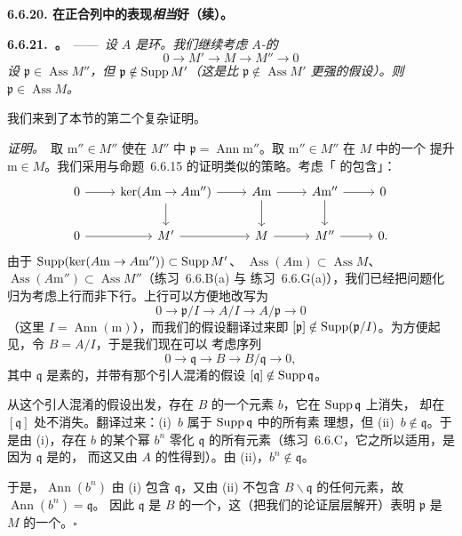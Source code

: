 \textbf{6.6.20. \trAssociatedPoint{}在正合列中的表现\emph{相当}好（续）。}

\textbf{6.6.21.\ \trhProposition。}\ ——\ \emph{设 $A$ 是\trNoetherian{}环。我们继续考虑
$A$-\trModule{}的\trShortExactSequence}
\[
0\longrightarrow M'\longrightarrow M\longrightarrow M''\longrightarrow 0
\]
\emph{设 $\mathfrak{p}\in\operatorname{Ass}M''$，但 $\mathfrak{p}\notin\operatorname{Supp} M'$（这是比
$\mathfrak{p}\notin\operatorname{Ass}M'$ 更强的假设）。则 $\mathfrak{p}\in\operatorname{Ass}M$。}

我们来到了本节的第二个复杂证明。

\emph{证明。}\ 取 $\mathrm{m}''\in M''$ 使在 $M''$ 中
$\mathfrak{p}=\operatorname{Ann}\mathrm{m}''$。取 $\mathrm{m}''\in M''$ 在 $M$ 中的一个
提升 $\mathrm{m}\in M$。我们采用与命题~6.6.15 的证明类似的策略。考虑「\trShortExactSequence{}%
的包含」：
\[
\begin{tikzcd}
0 \ar[r] & \ker(A\mathrm{m}\to A\mathrm{m}'') \ar[r] \ar[d] & A\mathrm{m} \ar[r] \ar[d] & A\mathrm{m}'' \ar[r] \ar[d] & 0 \\
0 \ar[r] & M' \ar[r] & M \ar[r] & M'' \ar[r] & 0.
\end{tikzcd}
\]
由于 $\operatorname{Supp}(\ker(A\mathrm{m}\to A\mathrm{m}''))\subset\operatorname{Supp} M'$、%
$\operatorname{Ass}(A\mathrm{m})\subset\operatorname{Ass}M$、%
$\operatorname{Ass}(A\mathrm{m}'')\subset\operatorname{Ass}M''$（练习~6.6.B(a) 与
练习~6.6.G(a)），我们已经把问题化归为考虑上行而非下行。上行可以方便地改写为
\[
0\longrightarrow\mathfrak{p}/I\longrightarrow A/I\longrightarrow A/\mathfrak{p}
  \longrightarrow 0
\]
（这里 $I=\operatorname{Ann}(\mathrm{m})$），而我们的假设翻译过来即
$[\mathfrak{p}]\notin\operatorname{Supp}(\mathfrak{p}/I)$。为方便起见，令 $B=A/I$，于是我们现在可以
考虑序列
\[
0\longrightarrow\mathfrak{q}\longrightarrow B\longrightarrow B/\mathfrak{q}
  \longrightarrow 0,
\]
其中 $\mathfrak{q}$ 是素的，并带有那个引人混淆的假设
$[\mathfrak{q}]\notin\operatorname{Supp}\mathfrak{q}$。

从这个引人混淆的假设出发，存在 $B$ 的一个元素 $b$，它在 $\operatorname{Supp}\mathfrak{q}$ 上消失，
却在 $[\mathfrak{q}]$ 处不消失。翻译过来：(i)~$b$ 属于 $\operatorname{Supp}\mathfrak{q}$ 中的所有素
理想，但 (ii)~$b\notin\mathfrak{q}$。于是由 (i)，存在 $b$ 的某个幂 $b^n$ 零化 $\mathfrak{q}$
的所有元素（练习~6.6.C，它之所以适用，是因为 $\mathfrak{q}$ 是\trFinitelyGenerated{}的，
而这又由 $A$ 的\trNoetherian{}性得到）。由 (ii)，$b^n\notin\mathfrak{q}$。

于是，$\operatorname{Ann}(b^n)$ 由 (i) 包含 $\mathfrak{q}$，又由 (ii) 不包含
$B\smallsetminus\mathfrak{q}$ 的任何元素，故 $\operatorname{Ann}(b^n)=\mathfrak{q}$。
因此 $\mathfrak{q}$ 是 $B$ 的一个\trAssociatedPrimeIdeal{}，这（把我们的论证层层解开）表明 $\mathfrak{p}$
是 $M$ 的一个\trAssociatedPrimeIdeal{}。\hfill$\square$

